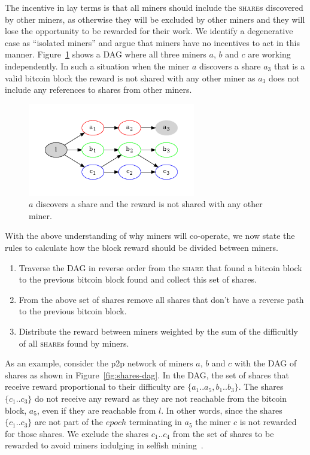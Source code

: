 \documentclass{article}
\begin{document}
The incentive in lay terms is that all miners should include the
\textsc{share}s discovered by other miners, as otherwise they will be
excluded by other miners and they will lose the opportunity to be
rewarded for their work. We identify a degenerative case as ``isolated
miners'' and argue that miners have no incentives to act in this
manner. Figure~\ref{fig:isolated-miners} shows a DAG where all three
miners $a$, $b$ and $c$ are working independently. In such a situation
when the miner $a$ discovers a share $a_3$ that is a valid bitcoin
block the reward is not shared with any other miner as $a_3$ does not
include any references to shares from other miners.

\begin{figure}
  \begin{center}
    \includegraphics[width=0.65\textwidth]{isolated-miners}
    \caption{$a$ discovers a share and the reward is not shared with any
      other miner.}\label{fig:isolated-miners}
  \end{center}    
\end{figure}

With the above understanding of why miners will co-operate, we now
state the rules to calculate how the block reward should be divided
between miners.

\begin{enumerate}
\item Traverse the DAG in reverse order from the \textsc{share} that
  found a bitcoin block to the previous bitcoin block found and
  collect this set of shares.
\item From the above set of shares remove all shares that don't have
  a reverse path to the previous bitcoin block.
\item Distribute the reward between miners weighted by the sum of
  the difficultly of all \textsc{share}s found by miners.
\end{enumerate}

As an example, consider the p2p network of miners $a$, $b$ and $c$
with the DAG of shares as shown in Figure~\ref{fig:shares-dag}. In the
DAG, the set of shares that receive reward proportional to their
difficulty are $\{a_1..a_5, b_1..b_3\}$. The shares $\{c_1..c_3\}$ do
not receive any reward as they are not reachable from the bitcoin
block, $a_5$, even if they are reachable from $l$. In other words,
since the shares $\{c_1..c_3\}$ are not part of the $epoch$
terminating in $a_5$ the miner $c$ is not rewarded for those
shares. We exclude the shares $c_1..c_4$ from the set of shares to be
rewarded to avoid miners indulging in selfish
mining~\cite{majority-is-not-enough}.
\end{document}
